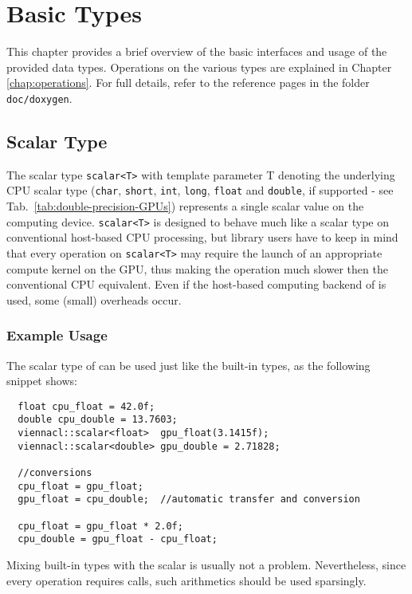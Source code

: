 \chapter{Basic Types} \label{chap:basic-types}
This chapter provides a brief overview of the basic interfaces and usage of the
provided data types. Operations on the various types are explained in
Chapter \ref{chap:operations}. For full details, refer to the reference pages
in the folder \texttt{doc/doxygen}.

\section {Scalar Type}
The scalar type \lstinline|scalar<T>| with template parameter T
denoting the underlying CPU scalar type (\lstinline|char|, \lstinline|short|, \lstinline|int|, \lstinline|long|, \lstinline|float| and \lstinline|double|, if supported - see Tab.~\ref{tab:double-precision-GPUs}) represents a
single scalar value on the computing device. \lstinline|scalar<T>| is designed to behave much
like a scalar type on conventional host-based CPU processing, but library users have to keep in mind that
every operation on \lstinline|scalar<T>| may require the launch of an appropriate
compute kernel on the GPU, thus making the operation much slower then the conventional CPU equivalent.
Even if the host-based computing backend of {\ViennaCL} is used, some (small) overheads occur.


\subsection{Example Usage}
The scalar type of {\ViennaCL} can be used just like the built-in
types, as the following snippet shows:
\begin{lstlisting}
  float cpu_float = 42.0f;
  double cpu_double = 13.7603;
  viennacl::scalar<float>  gpu_float(3.1415f);
  viennacl::scalar<double> gpu_double = 2.71828;

  //conversions
  cpu_float = gpu_float;
  gpu_float = cpu_double;  //automatic transfer and conversion

  cpu_float = gpu_float * 2.0f;
  cpu_double = gpu_float - cpu_float;
\end{lstlisting}
Mixing built-in types with the {\ViennaCL} scalar is usually not a
problem. Nevertheless, since every operation requires {\OpenCL} calls, such
arithmetics should be used sparsingly.

